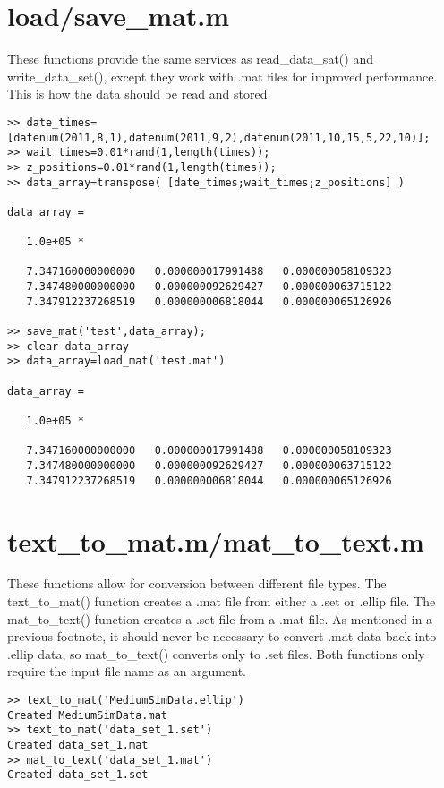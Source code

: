 \documentclass[12pt]{report}
\begin{document}
\section{load/save\_mat.m}
These functions provide the same services as read\_data\_sat() and write\_data\_set(), except they work with .mat files for improved performance.  This is how the data should be read and stored.

\begin{verbatim}
>> date_times=[datenum(2011,8,1),datenum(2011,9,2),datenum(2011,10,15,5,22,10)];
>> wait_times=0.01*rand(1,length(times));
>> z_positions=0.01*rand(1,length(times));
>> data_array=transpose( [date_times;wait_times;z_positions] )

data_array =

   1.0e+05 *

   7.347160000000000   0.000000017991488   0.000000058109323
   7.347480000000000   0.000000092629427   0.000000063715122
   7.347912237268519   0.000000006818044   0.000000065126926

>> save_mat('test',data_array);
>> clear data_array
>> data_array=load_mat('test.mat')

data_array =

   1.0e+05 *

   7.347160000000000   0.000000017991488   0.000000058109323
   7.347480000000000   0.000000092629427   0.000000063715122
   7.347912237268519   0.000000006818044   0.000000065126926
\end{verbatim}

\section{text\_to\_mat.m/mat\_to\_text.m}
These functions allow for conversion between different file types.  The text\_to\_mat() function creates a .mat file from either a .set or .ellip file.  The mat\_to\_text() function creates a .set file from a .mat file.  As mentioned in a previous footnote, it should never be necessary to convert .mat data back into .ellip data, so mat\_to\_text() converts only to .set files.  Both functions only require the input file name as an argument.

\begin{verbatim}
>> text_to_mat('MediumSimData.ellip')
Created MediumSimData.mat
>> text_to_mat('data_set_1.set')
Created data_set_1.mat
>> mat_to_text('data_set_1.mat')
Created data_set_1.set
\end{verbatim}
\end{document}
